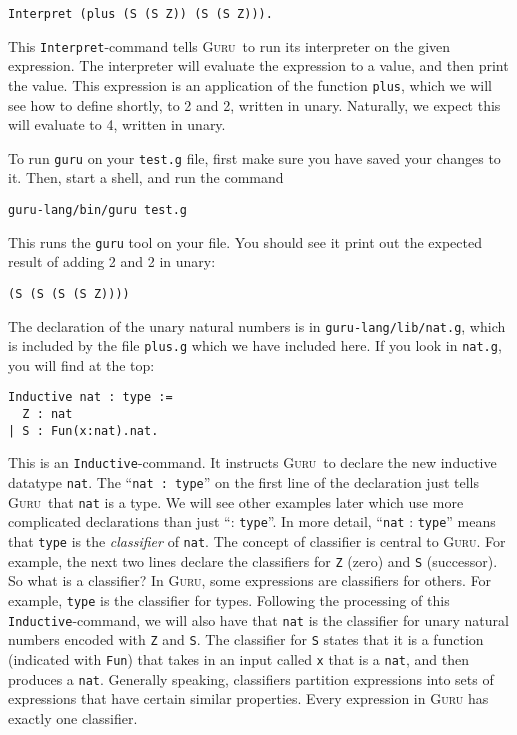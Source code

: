 \documentclass{book}[12pt]
\newcommand{\guru}[0]{\textsc{Guru}}
\begin{document}
\begin{verbatim}
Interpret (plus (S (S Z)) (S (S Z))).
\end{verbatim}

\noindent This \texttt{Interpret}-command tells \guru\ to run its
interpreter on the given expression.  The interpreter will evaluate
the expression to a value, and then print the value.  This expression
is an application of the function \texttt{plus}, which we will see how
to define shortly, to 2 and 2, written in unary.  Naturally, we expect
this will evaluate to 4, written in unary.

To run \texttt{guru} on your \texttt{test.g} file, first make sure
you have saved your changes to it.  Then, start a shell, and run
the command

\begin{verbatim}
guru-lang/bin/guru test.g
\end{verbatim}

\noindent This runs the \texttt{guru} tool on your file.  You should
see it print out the expected result of adding 2 and 2 in unary:

\begin{verbatim}
(S (S (S (S Z))))
\end{verbatim}

The declaration of the unary natural numbers is in
\texttt{guru-lang/lib/nat.g}, which is included by the file
\texttt{plus.g} which we have included here.  If you look in
\texttt{nat.g}, you will find at the top:

\begin{verbatim}
Inductive nat : type :=
  Z : nat
| S : Fun(x:nat).nat.
\end{verbatim}

\noindent This is an \texttt{Inductive}-command.  It instructs \guru\
to declare the new inductive datatype \texttt{nat}.  The ``\texttt{nat
: type}'' on the first line of the declaration just tells \guru\ that
\texttt{nat} is a type.  We will see other examples later which use
more complicated declarations than just ``: \texttt{type}''.  In more
detail, ``\texttt{nat} : \texttt{type}'' means that \texttt{type} is
the \emph{classifier} of \texttt{nat}.  The concept of classifier is
central to \guru.  For example, the next two lines declare the
classifiers for \texttt{Z} (zero) and \texttt{S} (successor).  So what
is a classifier?  In \guru, some expressions are classifiers for
others.  For example, \texttt{type} is the classifier for types.
Following the processing of this \texttt{Inductive}-command, we will
also have that \texttt{nat} is the classifier for unary natural
numbers encoded with \texttt{Z} and \texttt{S}.  The classifier for
\texttt{S} states that it is a function (indicated with \texttt{Fun})
that takes in an input called \texttt{x} that is a \texttt{nat}, and
then produces a \texttt{nat}.  Generally speaking, classifiers
partition expressions into sets of expressions that have certain
similar properties.  Every expression in \textsc{Guru} has exactly one
classifier.
\end{document}
